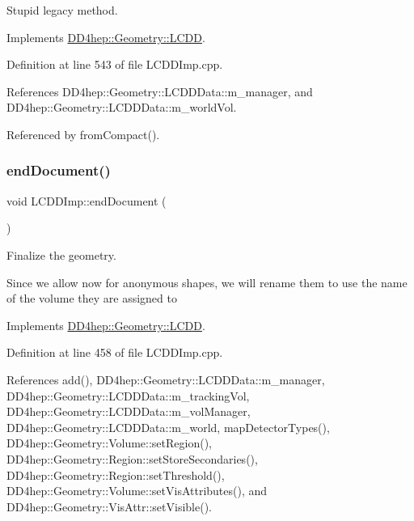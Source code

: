 Stupid legacy method. 



Implements \hyperlink{class_d_d4hep_1_1_geometry_1_1_l_c_d_d_aa67b3fbf93d48e08c08b60cdd83b729f}{D\+D4hep\+::\+Geometry\+::\+L\+C\+DD}.



Definition at line 543 of file L\+C\+D\+D\+Imp.\+cpp.



References D\+D4hep\+::\+Geometry\+::\+L\+C\+D\+D\+Data\+::m\+\_\+manager, and D\+D4hep\+::\+Geometry\+::\+L\+C\+D\+D\+Data\+::m\+\_\+world\+Vol.



Referenced by from\+Compact().

\hypertarget{class_d_d4hep_1_1_geometry_1_1_l_c_d_d_imp_aa3fa37aa7608b67f95aa644dc381389f}{}\label{class_d_d4hep_1_1_geometry_1_1_l_c_d_d_imp_aa3fa37aa7608b67f95aa644dc381389f} 
\subsubsection{\texorpdfstring{end\+Document()}{endDocument()}}
{\footnotesize\ttfamily void L\+C\+D\+D\+Imp\+::end\+Document (\begin{DoxyParamCaption}{ }\end{DoxyParamCaption})\hspace{0.3cm}{\ttfamily [virtual]}}



Finalize the geometry. 

Since we allow now for anonymous shapes, we will rename them to use the name of the volume they are assigned to 

Implements \hyperlink{class_d_d4hep_1_1_geometry_1_1_l_c_d_d_abe2147b8363040ce95bb40f810d95b36}{D\+D4hep\+::\+Geometry\+::\+L\+C\+DD}.



Definition at line 458 of file L\+C\+D\+D\+Imp.\+cpp.



References add(), D\+D4hep\+::\+Geometry\+::\+L\+C\+D\+D\+Data\+::m\+\_\+manager, D\+D4hep\+::\+Geometry\+::\+L\+C\+D\+D\+Data\+::m\+\_\+tracking\+Vol, D\+D4hep\+::\+Geometry\+::\+L\+C\+D\+D\+Data\+::m\+\_\+vol\+Manager, D\+D4hep\+::\+Geometry\+::\+L\+C\+D\+D\+Data\+::m\+\_\+world, map\+Detector\+Types(), D\+D4hep\+::\+Geometry\+::\+Volume\+::set\+Region(), D\+D4hep\+::\+Geometry\+::\+Region\+::set\+Store\+Secondaries(), D\+D4hep\+::\+Geometry\+::\+Region\+::set\+Threshold(), D\+D4hep\+::\+Geometry\+::\+Volume\+::set\+Vis\+Attributes(), and D\+D4hep\+::\+Geometry\+::\+Vis\+Attr\+::set\+Visible().



